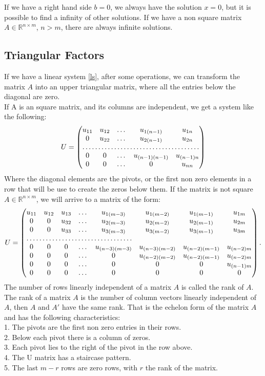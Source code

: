 \documentclass[a4paper,10pt]{report}
\begin{document}
If we have a right hand side $b=0$, we always have the solution $x=0$, but it is
possible to find a infinity of other solutions. If we have a non square matrix
$A\in \mathbb{R}^{n\times m}$, $n>m$, there are always infinite solutions.
\subsection*{Triangular Factors}
If we have a linear system \eqref{ls}, after some operations, we can transform the
matrix $A$ into an upper triangular matrix, where all the entries below the 
diagonal are zero.\\
If A is an square matrix, and its columns are independent, we get a system like the 
following:
\begin{equation*}
U=
\begin{pmatrix}
u_{11} & u_{12} & \dots &u_{1(n-1)}& u_{1n}\\
0 & u_{22} & \dots &u_{2(n-1)} &u_{2n}\\
\hdotsfor{5}\\
0 & 0 & \dots &u_{(n-1)(n-1)}& u_{(n-1)n}\\
0 & 0& \dots&0 &u_{nn}
\end{pmatrix}
\end{equation*}
Where the diagonal elements are the pivots, or the first non zero elements in a row
that will be use to create the zeros below them.
If the matrix is not square $A\in\mathbb{R}^{n\times m}$, we will arrive to a matrix of the form:
\begin{equation*}
U=
\begin{pmatrix}
u_{11} & u_{12} & u_{13}&\dots&u_{1(m-3)} &u_{1(m-2)}&u_{1(m-1)}& u_{1m}\\
0 & 0 & u_{32}&\dots&u_{2(m-3)} &u_{2(m-2)}&u_{2(m-1)} &u_{2m}\\
0 & 0 &u_{33} &\dots&u_{3(m-3)} &u_{3(m-2)}&u_{3(m-1)} &u_{3m}\\
\hdotsfor{5}\\
0 & 0 & 0&\dots&u_{(n-3)(m-3)}&u_{(n-3)(m-2)} &u_{(n-2)(m-1)}  &u_{(n-2)m}\\
0 & 0 & 0&\dots&0&u_{(n-2)(m-2)} & u_{(n-2)(m-1)} &u_{(n-2)m}\\
0 & 0 & 0&\dots&0 &0&0& u_{(n-1)m}\\
0 & 0& 0&\dots&0&0 &0&0
\end{pmatrix}.
\end{equation*}
The number of rows linearly independent of a matrix $A$ is called the rank of $A$.
The rank of a matrix $A$ is the number of column vectors linearly independent of $A$,
then $A$ and $A'$ have the same rank.
That is the echelon form of the matrix $A$ and has the following characteristics:\\
1. The pivots are the first non zero entries in their rows.\\
2. Below each pivot there is a column of zeros.\\
3. Each pivot lies to the right of the pivot in the row above. \\
4. The U matrix has a staircase pattern.\\
5. The last $m-r$ rows are zero rows, with $r$ the rank of the matrix. 
\end{document}
